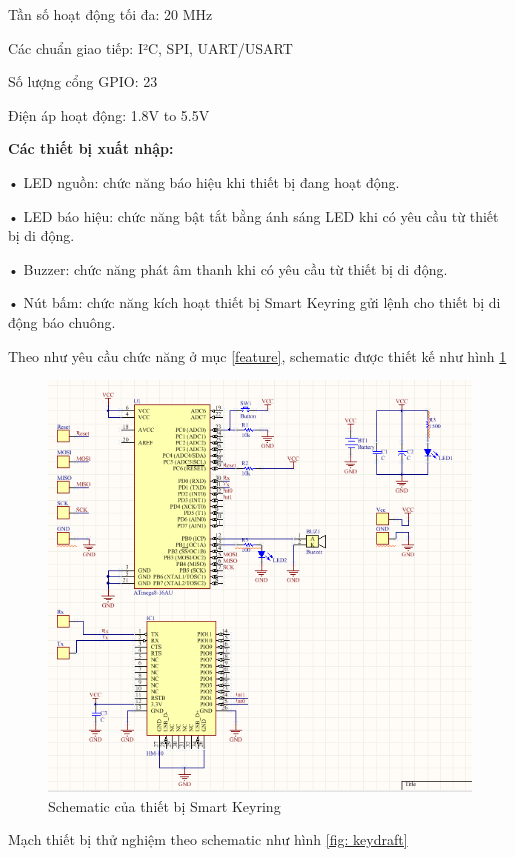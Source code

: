 Tần số hoạt động tối đa:	 20 MHz

Các chuẩn giao tiếp:	 I²C, SPI, UART/USART

Số lượng cổng GPIO:	 23

Điện áp hoạt động:	 1.8V to 5.5V

\textbf{Các thiết bị xuất nhập:}

• LED nguồn: chức năng báo hiệu khi thiết bị đang hoạt động.

• LED báo hiệu: chức năng bật tắt bằng ánh sáng LED khi có yêu cầu từ thiết bị di động.

• Buzzer: chức năng phát âm thanh khi có yêu cầu từ thiết bị di động.

• Nút bấm: chức năng kích hoạt thiết bị Smart Keyring gửi lệnh cho thiết bị di động báo chuông.

Theo như yêu cầu chức năng ở mục \ref{feature}, schematic được thiết kế như hình \ref{fig: schematic}

	\begin{figure}[H]
		\centering    
		\includegraphics[width=1.0\textwidth]{schematic}
		\caption[Schematic của thiết bị Smart Keyring]{Schematic của thiết bị Smart Keyring}
		\label{fig: schematic}
	\end{figure}
	
Mạch thiết bị thử nghiệm theo schematic như hình \ref{fig: keydraft}

